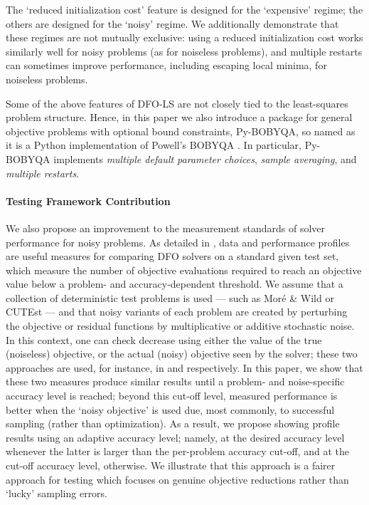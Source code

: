 The `reduced initialization cost' feature is designed for the `expensive' regime; the others are designed for the `noisy' regime.
We additionally demonstrate that these regimes are not mutually exclusive: using a reduced initialization cost works similarly well for noisy problems (as for noiseless problems), and multiple restarts can sometimes improve performance, including escaping local minima, for noiseless problems.

Some of the above features of DFO-LS are not closely tied to the least-squares problem structure.
Hence, in this paper we also introduce a package for general objective problems with optional bound constraints, Py-BOBYQA, so named as it is a Python implementation of Powell's BOBYQA \cite{Powell2009}.
In particular, Py-BOBYQA implements \textit{multiple default parameter choices}, \textit{sample averaging}, and \textit{multiple restarts}.

\paragraph{Testing Framework Contribution}
We also propose an improvement to the measurement standards of solver performance for noisy problems.
As detailed in \cite{More2009}, data and performance profiles are useful measures for comparing DFO solvers on a standard given test set, which measure the number of objective evaluations required to reach an objective value below a problem- and accuracy-dependent threshold. We assume that  a collection of deterministic test problems is used --- such as Mor\'e \& Wild or CUTEst ---
and that noisy variants of each problem are created by perturbing the objective or residual functions by multiplicative or additive stochastic noise. In this context, 
one can check decrease using either the value of the true (noiseless) objective, or the actual (noisy) objective seen by the solver; these two approaches are used, for instance, in \cite{Chen2016} and \cite{Billups2013} respectively.
In this paper, we show that these two measures produce similar results until a problem- and noise-specific accuracy level is reached; beyond this cut-off level, measured performance is better when the `noisy objective'  is used due, most commonly, to successful sampling (rather than optimization). 
As a result, we propose  showing profile results using an adaptive accuracy level; namely,
at the desired accuracy level whenever the latter is larger than the per-problem accuracy cut-off, and at the cut-off accuracy level, otherwise.
We illustrate that this approach is  a fairer approach for testing which focuses on genuine objective reductions rather than `lucky' sampling errors.

